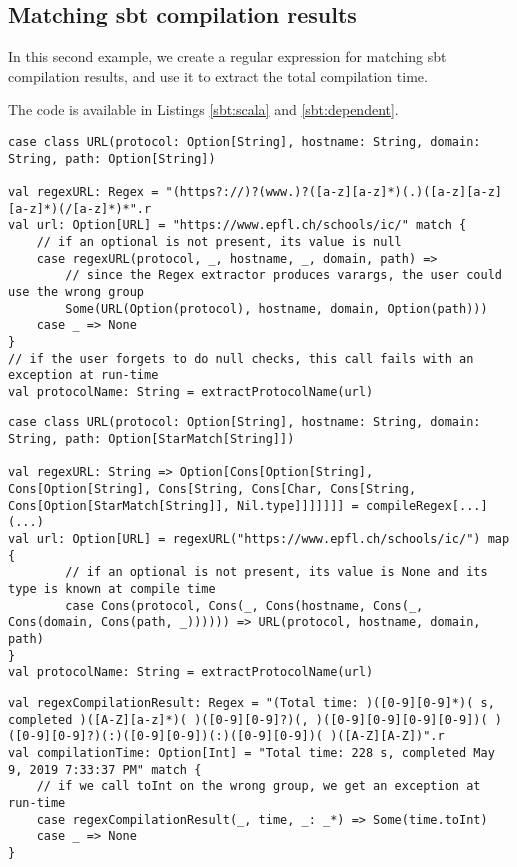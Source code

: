\subsection{Matching sbt compilation results}
In this second example, we create a regular expression for matching sbt compilation results, and use it to extract the total compilation time.

The code is available in Listings \ref{sbt:scala} and \ref{sbt:dependent}.

\onecolumn

\begin{lstlisting}[style=myScalastyle, caption={Matching URLs with Scala regex.}, captionpos=b, label={URL:scala}, basicstyle={\small\ttfamily}]
case class URL(protocol: Option[String], hostname: String, domain: String, path: Option[String])

val regexURL: Regex = "(https?://)?(www.)?([a-z][a-z]*)(.)([a-z][a-z][a-z]*)(/[a-z]*)*".r
val url: Option[URL] = "https://www.epfl.ch/schools/ic/" match {
    // if an optional is not present, its value is null
    case regexURL(protocol, _, hostname, _, domain, path) => 
        // since the Regex extractor produces varargs, the user could use the wrong group
        Some(URL(Option(protocol), hostname, domain, Option(path))) 
    case _ => None
}
// if the user forgets to do null checks, this call fails with an exception at run-time
val protocolName: String = extractProtocolName(url) 
\end{lstlisting}

\begin{lstlisting}[style=myScalastyle, caption={Matching URLs with match types.}, captionpos=b, label={URL:match}]
case class URL(protocol: Option[String], hostname: String, domain: String, path: Option[StarMatch[String]])

val regexURL: String => Option[Cons[Option[String], Cons[Option[String], Cons[String, Cons[Char, Cons[String, Cons[Option[StarMatch[String]], Nil.type]]]]]]] = compileRegex[...](...)
val url: Option[URL] = regexURL("https://www.epfl.ch/schools/ic/") map {
        // if an optional is not present, its value is None and its type is known at compile time
        case Cons(protocol, Cons(_, Cons(hostname, Cons(_, Cons(domain, Cons(path, _)))))) => URL(protocol, hostname, domain, path)
}
val protocolName: String = extractProtocolName(url) 
\end{lstlisting}

\begin{lstlisting}[style=myScalastyle, caption={Matching sbt compilation results with Scala regex.}, captionpos=b, label={sbt:scala}]
val regexCompilationResult: Regex = "(Total time: )([0-9][0-9]*)( s, completed )([A-Z][a-z]*)( )([0-9][0-9]?)(, )([0-9][0-9][0-9][0-9])( )([0-9][0-9]?)(:)([0-9][0-9])(:)([0-9][0-9])( )([A-Z][A-Z])".r
val compilationTime: Option[Int] = "Total time: 228 s, completed May 9, 2019 7:33:37 PM" match {
    // if we call toInt on the wrong group, we get an exception at run-time
    case regexCompilationResult(_, time, _: _*) => Some(time.toInt)
    case _ => None
}
\end{lstlisting}

